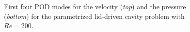 \documentclass{elsarticle}
\numberwithin{equation}{section}
\theoremstyle{theorem}
\theoremstyle{definition}
\theoremstyle{remark}
\theoremstyle{proposition}
\numberwithin{figure}{section}
\begin{document}
\begin{figure}[t!]
			
			\caption{First four POD modes for the velocity (\emph{top}) and the pressure (\emph{bottom}) for the parametrized lid-driven cavity problem with $Re = 200$.}
			\label{fig:dc-modal-functions}
		\end{figure}
		\fi
		
\end{document}

